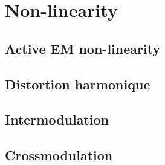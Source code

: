 
\section{Non-linearity}
\subsection{Active EM non-linearity}
\subsection{Distortion harmonique}
\subsection{Intermodulation}
\subsection{Crossmodulation}

